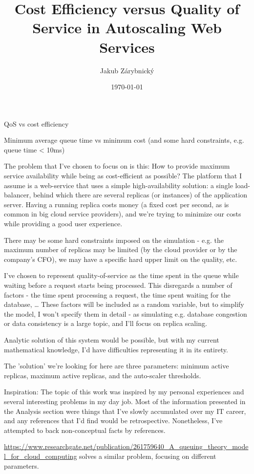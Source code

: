 \documentclass{scrartcl}
\author{Jakub Zárybnický}
\date{\today}
\title{Cost Efficiency versus Quality of Service in Autoscaling Web Services}
\begin{document}
\maketitle
QoS vs cost efficiency

Minimum average queue time vs minimum cost (and some hard constraints,
e.g. queue time < 10ms)

The problem that I've chosen to focus on is this: How to provide maximum service
availability while being as cost-efficient as possible? The platform that I
assume is a web-service that uses a simple high-availability solution: a single
load-balancer, behind which there are several replicas (or instances) of the
application server. Having a running replica costs money (a fixed cost per
second, as is common in big cloud service providers), and we're trying to
minimize our costs while providing a good user experience.

There may be some hard constraints imposed on the simulation - e.g. the maximum number
of replicas may be limited (by the cloud provider or by the company's CFO), we
may have a specific hard upper limit on the quality, etc.

I've chosen to represent quality-of-service as the time spent in the queue while
waiting before a request starts being processed. This disregards a number of
factors - the time spent processing a request, the time spent waiting for the
database, \ldots{} These factors will be included as a random variable, but to
simplify the model, I won't specify them in detail - as simulating e.g. database
congestion or data consistency is a large topic, and I'll focus on replica
scaling.

Analytic solution of this system would be possible, but with my current
mathematical knowledge, I'd have difficulties representing it in its entirety.

The 'solution' we're looking for here are three parameters: minimum active
replicas, maximum active replicas, and the auto-scaler thresholds.

Inspiration:
The topic of this work was inspired by my personal experiences and several
interesting problems in my day job. Most of the information presented in the
Analysis section were things that I've slowly accumulated over my IT career, and
any references that I'd find would be retrospective. Nonetheless, I've attempted
to back non-conceptual facts by references.

\url{https://www.researchgate.net/publication/261759640_A_queuing_theory_model_for_cloud_computing}
solves a similar problem, focusing on different parameters.
\end{document}
